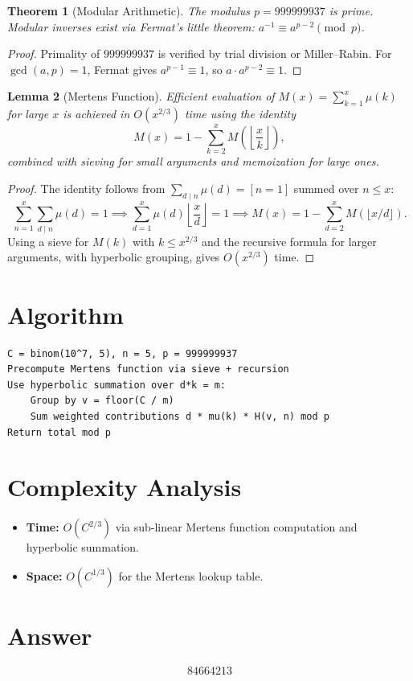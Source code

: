\documentclass[a4paper,12pt]{article}
\newtheorem{theorem}{Theorem}
\newtheorem{lemma}[theorem]{Lemma}
\begin{document}
\begin{theorem}[Modular Arithmetic]
The modulus $p = 999999937$ is prime. Modular inverses exist via Fermat's little theorem: $a^{-1} \equiv a^{p-2} \pmod{p}$.
\end{theorem}

\begin{proof}
Primality of $999999937$ is verified by trial division or Miller--Rabin. For $\gcd(a,p) = 1$, Fermat gives $a^{p-1} \equiv 1$, so $a \cdot a^{p-2} \equiv 1$.
\end{proof}

\begin{lemma}[Mertens Function]
Efficient evaluation of $M(x) = \sum_{k=1}^{x} \mu(k)$ for large $x$ is achieved in $O(x^{2/3})$ time using the identity
\[
M(x) = 1 - \sum_{k=2}^{x} M\!\left(\left\lfloor \frac{x}{k} \right\rfloor\right),
\]
combined with sieving for small arguments and memoization for large ones.
\end{lemma}

\begin{proof}
The identity follows from $\sum_{d \mid n} \mu(d) = [n = 1]$ summed over $n \le x$:
\[
\sum_{n=1}^{x} \sum_{d \mid n} \mu(d) = 1 \implies \sum_{d=1}^{x} \mu(d) \left\lfloor \frac{x}{d} \right\rfloor = 1 \implies M(x) = 1 - \sum_{d=2}^{x} M\!\left(\lfloor x/d \rfloor\right).
\]
Using a sieve for $M(k)$ with $k \le x^{2/3}$ and the recursive formula for larger arguments, with hyperbolic grouping, gives $O(x^{2/3})$ time.
\end{proof}

\section{Algorithm}

\begin{verbatim}
C = binom(10^7, 5), n = 5, p = 999999937
Precompute Mertens function via sieve + recursion
Use hyperbolic summation over d*k = m:
    Group by v = floor(C / m)
    Sum weighted contributions d * mu(k) * H(v, n) mod p
Return total mod p
\end{verbatim}

\section{Complexity Analysis}
\begin{itemize}
    \item \textbf{Time:} $O(C^{2/3})$ via sub-linear Mertens function computation and hyperbolic summation.
    \item \textbf{Space:} $O(C^{1/3})$ for the Mertens lookup table.
\end{itemize}

\section{Answer}

\[
\boxed{84664213}
\]
\end{document}
